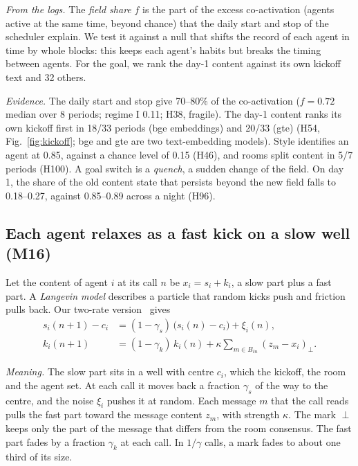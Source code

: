\emph{From the logs.} The \emph{field share} $f$ is the part of the excess co-activation (agents active at the same time, beyond chance) that the daily start and stop of the scheduler explain. We test it against a null that shifts the record of each agent in time by whole blocks: this keeps each agent's habits but breaks the timing between agents. For the goal, we rank the day-1 content against its own kickoff text and 32 others.

\emph{Evidence.} The daily start and stop give 70--80\% of the co-activation ($f=0.72$ median over 8 periods; regime I 0.11; H38, fragile). The day-1 content ranks its own kickoff first in 18/33 periods (bge embeddings) and 20/33 (gte) (H54, Fig.~\ref{fig:kickoff}; bge and gte are two text-embedding models). Style identifies an agent at 0.85, against a chance level of 0.15 (H46), and rooms split content in 5/7 periods (H100). A goal switch is a \emph{quench}, a sudden change of the field. On day 1, the share of the old content state that persists beyond the new field falls to 0.18--0.27, against 0.85--0.89 across a night (H96).

\subsection{Each agent relaxes as a fast kick on a slow well (M16)}\label{sec:p16}

Let the content of agent $i$ at its call $n$ be $x_i=s_i+k_i$, a slow part plus a fast part. A \emph{Langevin model} describes a particle that random kicks push and friction pulls back. Our two-rate version~\cite{uhlenbeck1930} gives
\begin{align}
s_i(n+1)-c_i&=(1-\gamma_s)\,\big(s_i(n)-c_i\big)+\xi_i(n),\nonumber\\
k_i(n+1)&=(1-\gamma_k)\,k_i(n)+\kappa\!\!\sum_{m\in B_{in}}\!\!(z_m-x_i)_\perp .
\label{eq:pic-langevin}
\end{align}

\emph{Meaning.} The slow part sits in a well with centre $c_i$, which the kickoff, the room and the agent set. At each call it moves back a fraction $\gamma_s$ of the way to the centre, and the noise $\xi_i$ pushes it at random. Each message $m$ that the call reads pulls the fast part toward the message content $z_m$, with strength $\kappa$. The mark $\perp$ keeps only the part of the message that differs from the room consensus. The fast part fades by a fraction $\gamma_k$ at each call. In $1/\gamma$ calls, a mark fades to about one third of its size.

